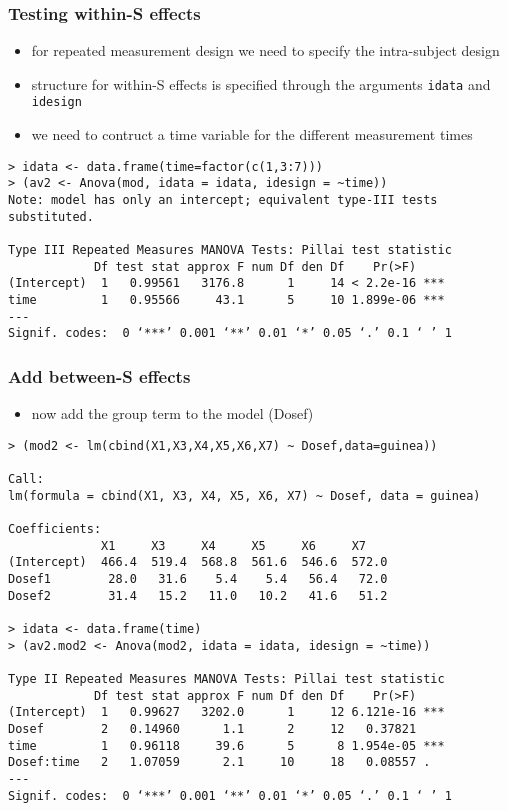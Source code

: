 \begin{frame}[fragile]\frametitle{Testing within-S effects}
  \begin{itemize}
  \item for repeated measurement design we need to specify the intra-subject design
  \item  structure  for  within-S  effects is specified through the arguments \texttt{idata} and \texttt{idesign}
  \item we need to contruct a time variable for the different measurement times
  \end{itemize}\scriptsize
\begin{verbatim}
> idata <- data.frame(time=factor(c(1,3:7)))
> (av2 <- Anova(mod, idata = idata, idesign = ~time))
Note: model has only an intercept; equivalent type-III tests substituted.

Type III Repeated Measures MANOVA Tests: Pillai test statistic
            Df test stat approx F num Df den Df    Pr(>F)    
(Intercept)  1   0.99561   3176.8      1     14 < 2.2e-16 ***
time         1   0.95566     43.1      5     10 1.899e-06 ***
---
Signif. codes:  0 ‘***’ 0.001 ‘**’ 0.01 ‘*’ 0.05 ‘.’ 0.1 ‘ ’ 1  
\end{verbatim}
\end{frame}

\begin{frame}\frametitle{Add between-S effects}
  \begin{itemize}
  \item now add the group term to the model (Dosef)
  \end{itemize}\tiny
\begin{verbatim}
> (mod2 <- lm(cbind(X1,X3,X4,X5,X6,X7) ~ Dosef,data=guinea))

Call:
lm(formula = cbind(X1, X3, X4, X5, X6, X7) ~ Dosef, data = guinea)

Coefficients:
             X1     X3     X4     X5     X6     X7   
(Intercept)  466.4  519.4  568.8  561.6  546.6  572.0
Dosef1        28.0   31.6    5.4    5.4   56.4   72.0
Dosef2        31.4   15.2   11.0   10.2   41.6   51.2

> idata <- data.frame(time)
> (av2.mod2 <- Anova(mod2, idata = idata, idesign = ~time))

Type II Repeated Measures MANOVA Tests: Pillai test statistic
            Df test stat approx F num Df den Df    Pr(>F)    
(Intercept)  1   0.99627   3202.0      1     12 6.121e-16 ***
Dosef        2   0.14960      1.1      2     12   0.37821    
time         1   0.96118     39.6      5      8 1.954e-05 ***
Dosef:time   2   1.07059      2.1     10     18   0.08557 .  
---
Signif. codes:  0 ‘***’ 0.001 ‘**’ 0.01 ‘*’ 0.05 ‘.’ 0.1 ‘ ’ 1
\end{verbatim}
\end{frame}

